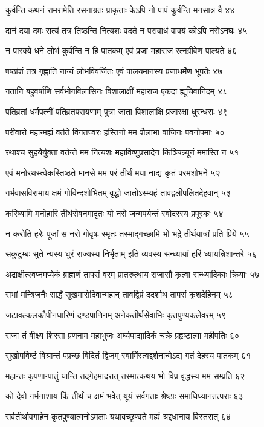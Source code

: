 कुर्वन्ति कथनं रामरामेति रसनाग्रतः
प्राकृताः केऽपि नो पापं कुर्वन्ति मनसात्र वै ४४

दानं दया दमः सत्यं तत्र तिष्ठन्ति नित्यशः
वदते न पराबाधं वाक्यं कोऽपि नरोऽनघः ४५

न पारक्ये धने लोभं कुर्वन्ति न हि पातकम्
एवं प्रजा महाराज रत्नग्रीवेण पाल्यते ४६

षष्ठांशं तत्र गृह्णाति नान्यं लोभविवर्जितः
एवं पालयमानस्य प्रजाधर्मेण भूपतेः ४७

गतानि बहुवर्षाणि सर्वभोगविलासिनः
विशालाक्षीं महाराज एकदा ह्यूचिवानिदम् ४८

पतिव्रतां धर्मपत्नीं पतिव्रतपरायणाम्
पुत्रा जाता विशालाक्षि प्रजारक्षा धुरन्धराः ४९

परीवारो महान्मह्यं वर्तते विगतज्वरः
हस्तिनो मम शैलाभा वाजिनः पवनोपमाः ५०

रथाश्च सुहयैर्युक्ता वर्तन्ते मम नित्यशः
महाविष्णुप्रसादेन किञ्चिन्न्यूनं ममास्ति न ५१

एवं मनोरथस्त्वेकस्तिष्ठते मानसे मम
परं तीर्थं मया नाद्य कृतं परमशोभने ५२

गर्भवासविरामाय क्षमं गोविन्दशोभितम्
वृद्धो जातोऽस्म्यहं तावद्वलीपलितदेहवान् ५३

करिष्यामि मनोहारि तीर्थसेवनमादृतः
यो नरो जन्मपर्यन्तं स्वोदरस्य प्रपूरकः ५४

न करोति हरेः पूजां स नरो गोवृषः स्मृतः
तस्माद्गच्छामि भो भद्रे तीर्थयात्रां प्रति प्रिये ५५

सकुटुम्बः सुते न्यस्य धुरं राज्यस्य निर्भृताम्
इति व्यवस्य सन्ध्यायां हरिं ध्यायन्निशान्तरे ५६

अद्राक्षीत्स्वप्नमप्येकं ब्राह्मणं तापसं वरम्
प्रातरुत्थाय राजासौ कृत्वा सन्ध्यादिकाः क्रियाः ५७

सभां मन्त्रिजनैः सार्द्धं सुखमासेदिवान्महान्
तावद्विप्रं ददर्शाथ तापसं कृशदेहिनम् ५८

जटावल्कलकौपीनधारिणं दण्डपाणिनम्
अनेकतीर्थसेवाभिः कृतपुण्यकलेवरम् ५९

राजा तं वीक्ष्य शिरसा प्रणनाम महाभुजः
अर्घ्यपाद्यादिकं चक्रे प्रहृष्टात्मा महीपतिः ६०

सुखोपविष्टं विश्रान्तं पप्रच्छ विदितं द्विजम्
स्वामिंस्त्वद्दर्शनान्मेऽद्य गतं देहस्य पातकम् ६१

महान्तः कृपणान्पातुं यान्ति तद्गेहमादरात्
तस्मात्कथय भो विप्र वृद्धस्य मम सम्प्रति ६२

को देवो गर्भनाशाय किं तीर्थं च क्षमं भवेत्
यूयं सर्वगताः श्रेष्ठाः समाधिध्यानतत्पराः ६३

सर्वतीर्थावगाहेन कृतपुण्यात्मनोऽमलाः
यथावच्छृण्वते मह्यं श्रद्दधानाय विस्तरात् ६४

